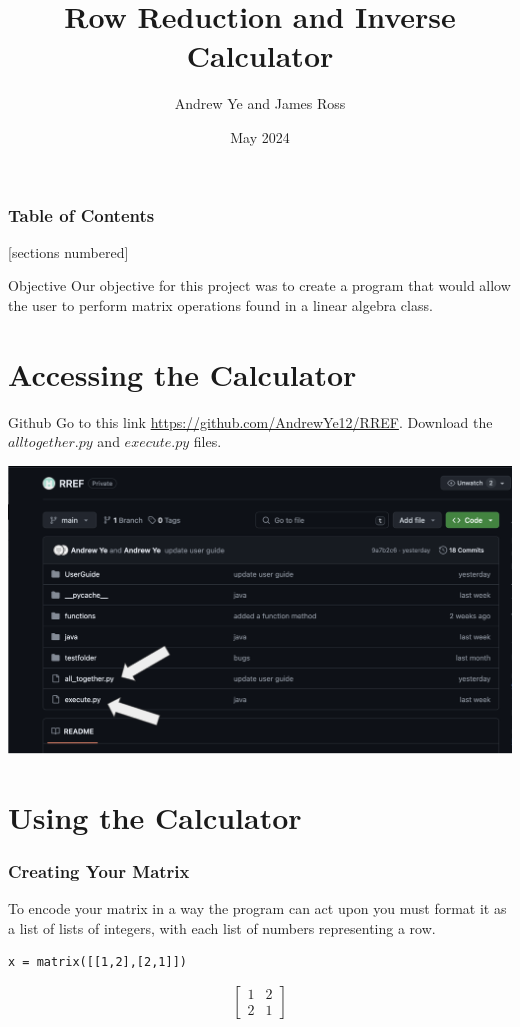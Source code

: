 \documentclass{beamer}
\title{Row Reduction and Inverse Calculator}
\author{Andrew Ye and James Ross}
\date{May 2024}
\begin{document}
\frame{\titlepage}

\begin{frame}
\frametitle{Table of Contents}
[sections numbered]
\tableofcontents
\end{frame}

\begin{frame}{Objective}
    Our objective for this project was to create a program that would allow the user to perform matrix operations found in a linear algebra class.
\end{frame}

\section{Accessing the Calculator}

\begin{frame}{Github}
    Go to this link \url{https://github.com/AndrewYe12/RREF}. Download the \(alltogether.py\) and \(execute.py\) files. \\
    \begin{center}
    \includegraphics[scale = 0.3]{photos/photo2.png}
    \end{center}
\end{frame}

\section{Using the Calculator}

\begin{frame}[fragile = singleslide]\frametitle{Creating Your Matrix}
    To encode your matrix in a way the program can act upon you must format it as a list of lists of integers, with each list of numbers representing a row.
\begin{verbatim}
x = matrix([[1,2],[2,1]]) 
\end{verbatim}
\begin{equation*}
\left[ \begin{array}{cc} 1&2 \\ 2&1 \end{array}\right]
\end{equation*}
\end{frame}
\end{document}
